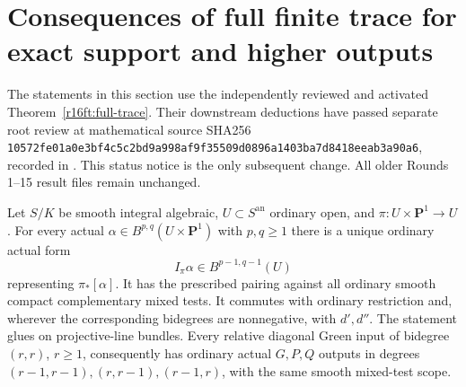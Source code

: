 \section{Consequences of full finite trace for exact support and higher outputs}
\label{r16fc:section}

The statements in this section use the independently reviewed and
activated Theorem~\ref{r16ft:full-trace}. Their downstream deductions
have passed separate root review at mathematical source SHA256
\texttt{10572fe01a0e3bf4c5c2bd9a998af9f35509d0896a1403ba7d8418eeab3a90a6},
recorded in .
This status notice is the only subsequent change.
All older Rounds 1--15 result files remain unchanged.

\begin{theorem}
\label{r16fc:all-line}
Let $S/K$ be smooth integral algebraic, $U\subset S^{\mathrm{an}}$
ordinary open, and $\pi:U\times\mathbf P^1\to U$. For every actual
$\alpha\in B^{p,q}(U\times\mathbf P^1)$ with $p,q\geq1$ there is a
unique ordinary actual form
\[
 I_\pi\alpha\in B^{p-1,q-1}(U)
\]
representing $\pi_*[\alpha]$. It has the prescribed pairing against
all ordinary smooth compact complementary mixed tests. It commutes
with ordinary restriction and, wherever the corresponding bidegrees
are nonnegative, with $d',d''$. The statement glues on projective-line
bundles. Every relative diagonal Green input of bidegree $(r,r)$,
$r\geq1$, consequently has ordinary actual $G,P,Q$ outputs in degrees
$(r-1,r-1),(r,r-1),(r-1,r)$, with the same smooth mixed-test scope.
\end{theorem}

